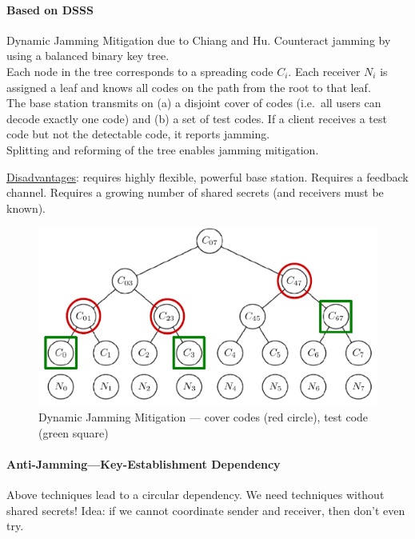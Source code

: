 \paragraph{Based on DSSS}
Dynamic Jamming Mitigation due to Chiang and Hu.
Counteract jamming by using a balanced binary key tree.
\\
Each node in the tree corresponds to a spreading code $C_i$.
Each receiver $N_i$ is assigned a leaf and knows all codes on the path from the root to that leaf.
\\
The base station transmits on (a) a disjoint cover of codes (i.e.\ all users can decode exactly one code) and (b) a set of test codes.
If a client receives a test code but not the detectable code, it reports jamming.
\\
Splitting and reforming of the tree enables jamming mitigation.

\underline{Disadvantages}:
requires highly flexible, powerful base station.
Requires a feedback channel.
Requires a growing number of shared secrets (and receivers must be known).

\begin{figure}[h]
	\centering
	\includegraphics[scale=1.4]{images/3-chiang.png}
	\caption{Dynamic Jamming Mitigation --- cover codes (red circle), test code (green square)}%
	\label{fig:chiang}
\end{figure}

\paragraph{Anti-Jamming---Key-Establishment Dependency}
Above techniques lead to a circular dependency.
We need techniques without shared secrets!
Idea: if we cannot coordinate sender and receiver, then don't even try.


